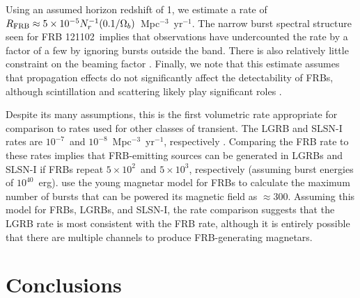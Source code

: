 \documentclass[twocolumn]{aastex61}
\newcommand{\frb}{FRB 121102}
\begin{document}
Using an assumed horizon redshift of 1, we estimate a rate of $R_{\rm{FRB}} \approx 5\times10^{-5} N_r^{-1} (0.1/\Omega_b)$\ Mpc$^{-3}$\ yr$^{-1}$. The narrow burst spectral structure seen for \frb\ implies that observations have undercounted the rate by a factor of a few by ignoring bursts outside the band. There is also relatively little constraint on the beaming factor \citep[$\sim0.1$ for pulsars;][]{1998MNRAS.298..625T}. Finally, we note that this estimate assumes that propagation effects do not significantly affect the detectability of FRBs, although scintillation and scattering likely play significant roles \citep{2015MNRAS.451.3278M, CORDES}.

Despite its many assumptions, this is the first volumetric rate appropriate for comparison to rates used for other classes of transient. The LGRB and SLSN-I rates are $10^{-7}$\ and $10^{-8}$\ Mpc$^{-3}$\ yr$^{-1}$, respectively \citep{2007ApJ...657L..73G,2012Sci...337..927G}. Comparing the FRB rate to these rates implies that FRB-emitting sources can be generated in LGRBs and SLSN-I if FRBs repeat $5\times10^2$\ and $5\times10^3$, respectively (assuming burst energies of $10^{40}$\ erg). \citet{2017arXiv170102370M} use the young magnetar model for FRBs to calculate the maximum number of bursts that can be powered its magnetic field as $\approx300$. Assuming this model for FRBs, LGRBs, and SLSN-I, the rate comparison suggests that the LGRB rate is most consistent with the FRB rate, although it is entirely possible that there are multiple channels to produce FRB-generating magnetars.


\section{Conclusions}
\end{document}
